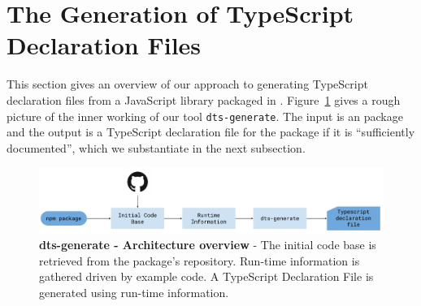 \documentclass[english,cleveref,autoref,submission]{programming}
\newcommand{\figref}[1]{Figure~\ref{#1}}
\begin{document}
\section{The Generation of TypeScript Declaration Files}
\label{sec:gener-typescr-decl}
This section gives an overview of our approach to generating
TypeScript declaration files from a JavaScript library packaged in
\NPM. \figref{fig:tsd_generation_method_block_diagram} gives a rough
picture of the inner working of our tool \texttt{dts-generate}. The
input is an \NPM{} package and the output is a TypeScript declaration
file for the package if it is ``sufficiently documented'', which we
substantiate in the next subsection.


\begin{figure}[tp]
    \centering
    \includegraphics[width=1\linewidth]{dts-generate-block-diagram.pdf}
    \caption[dts-generate - Architecture overview]{\textbf{dts-generate - Architecture
        overview} - The initial code base is retrieved from the \NPM{} package's
      repository.
      Run-time information is gathered driven by example code.
      A TypeScript Declaration File is generated using run-time
      information.
    } 
    \label{fig:tsd_generation_method_block_diagram}
  \end{figure}
\end{document}
